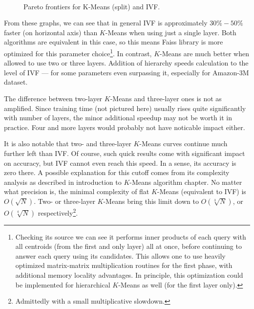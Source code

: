 \begin{figure}[H]
	\centering
	\\
	\caption{Pareto frontiers for K-Means (split) and IVF.}
\end{figure}

From these graphs, we can see that in general IVF is approximately $30\% - 50\%$ faster
(on horizontal axis) than $K$-Means when using just a single layer. Both algorithms are
equivalent in this case, so this means Faiss library is more optimized for this parameter 
choice\footnote{
Checking its source we can see it performs inner products of each query with all centroids
(from the first and only layer) all at once, before continuing to answer each query 
using its candidates. This allows one to use heavily optimized matrix-matrix multiplication
routines for the first phase, with additional memory locality advantages. 
In principle, this optimization
could be implemented for hierarchical $K$-Means as well (for the first layer only).
}.
In contrast, $K$-Means are much better when allowed to use two or three layers. Addition
of hierarchy speeds calculation to the level of IVF --- for some parameters even surpassing
it, especially for Amazon-3M dataset.

The difference between two-layer $K$-Means and three-layer ones is not as amplified. Since
training time (not pictured here) usually rises quite significantly with number of layers,
the minor additional speedup may not be worth it in practice. Four and more layers
would probably not have noticable impact either.

It is also notable that two- and three-layer $K$-Means curves continue much further left
than IVF. Of course, such quick results come with significant impact on accuracy, but
IVF cannot even reach this speed. In a sense, its accuracy is zero there.
A possible explanation for this cutoff comes from its complexity analysis as described
in introduction to $K$-Means algorithm chapter. No matter what precision is, the minimal
complexity of flat $K$-Means (equivalent to IVF) is $O(\sqrt{N})$. Two- or three-layer
$K$-Means bring this limit down to $O(\sqrt[3]{N})$, or $O(\sqrt[4]{N})$
respectively\footnote{Admittedly with a small multiplicative slowdown.}.

